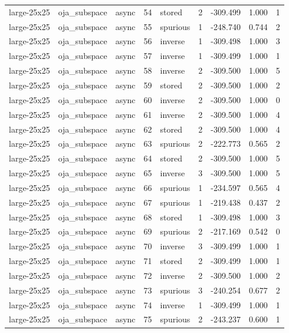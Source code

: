 \begin{tabular}{lllrlrrrr}
large-25x25 & oja\_subspace & async & 54 & stored & 2 & -309.499 & 1.000 & 1 \\
large-25x25 & oja\_subspace & async & 55 & spurious & 1 & -248.740 & 0.744 & 2 \\
large-25x25 & oja\_subspace & async & 56 & inverse & 1 & -309.498 & 1.000 & 3 \\
large-25x25 & oja\_subspace & async & 57 & inverse & 1 & -309.499 & 1.000 & 1 \\
large-25x25 & oja\_subspace & async & 58 & inverse & 2 & -309.500 & 1.000 & 5 \\
large-25x25 & oja\_subspace & async & 59 & stored & 2 & -309.500 & 1.000 & 2 \\
large-25x25 & oja\_subspace & async & 60 & inverse & 2 & -309.500 & 1.000 & 0 \\
large-25x25 & oja\_subspace & async & 61 & inverse & 2 & -309.500 & 1.000 & 4 \\
large-25x25 & oja\_subspace & async & 62 & stored & 2 & -309.500 & 1.000 & 4 \\
large-25x25 & oja\_subspace & async & 63 & spurious & 2 & -222.773 & 0.565 & 2 \\
large-25x25 & oja\_subspace & async & 64 & stored & 2 & -309.500 & 1.000 & 5 \\
large-25x25 & oja\_subspace & async & 65 & inverse & 3 & -309.500 & 1.000 & 5 \\
large-25x25 & oja\_subspace & async & 66 & spurious & 1 & -234.597 & 0.565 & 4 \\
large-25x25 & oja\_subspace & async & 67 & spurious & 1 & -219.438 & 0.437 & 2 \\
large-25x25 & oja\_subspace & async & 68 & stored & 1 & -309.498 & 1.000 & 3 \\
large-25x25 & oja\_subspace & async & 69 & spurious & 2 & -217.169 & 0.542 & 0 \\
large-25x25 & oja\_subspace & async & 70 & inverse & 3 & -309.499 & 1.000 & 1 \\
large-25x25 & oja\_subspace & async & 71 & stored & 2 & -309.499 & 1.000 & 1 \\
large-25x25 & oja\_subspace & async & 72 & inverse & 2 & -309.500 & 1.000 & 2 \\
large-25x25 & oja\_subspace & async & 73 & spurious & 3 & -240.254 & 0.677 & 2 \\
large-25x25 & oja\_subspace & async & 74 & inverse & 1 & -309.499 & 1.000 & 1 \\
large-25x25 & oja\_subspace & async & 75 & spurious & 2 & -243.237 & 0.600 & 1 \\

\end{tabular}
